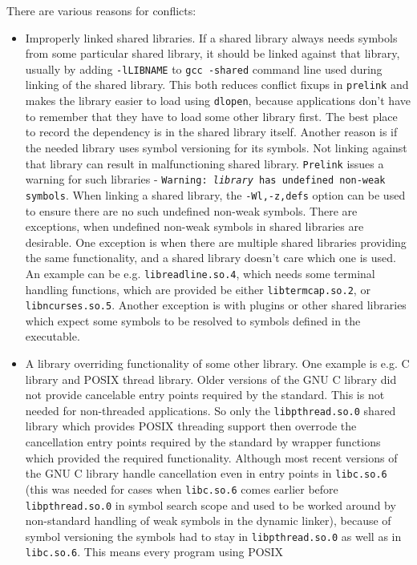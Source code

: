 \documentclass[twoside]{article}
\def\tts#1{\texttt{\small #1}}
\begin{document}
There are various reasons for conflicts:
\begin{itemize}
\item Improperly linked shared libraries.  If a shared library always needs
symbols from some particular shared library, it should be linked against
that library, usually by adding \tts{-lLIBNAME} to \tts{gcc -shared} command
line used during linking of the shared library.  This both reduces conflict
fixups in \tts{prelink} and makes the library easier to load using
\tts{dlopen}, because applications don't have to remember that they have
to load some other library first.  The best place to record the dependency
is in the shared library itself.  Another reason is if the needed library
uses symbol versioning for its symbols.  Not linking against that library
can result in malfunctioning shared library.  \tts{Prelink} issues a warning for
such libraries - \tts{Warning: {\sl library} has undefined non-weak symbols}.
When linking a shared library, the \tts{-Wl,-z,defs} option can be used to
ensure there are no such undefined non-weak symbols.  There are exceptions,
when undefined non-weak symbols in shared libraries are desirable.
One exception is when there are multiple shared libraries providing the
same functionality, and a shared library doesn't care which one is used.
An example can be e.g. \tts{libreadline.so.4}, which needs some terminal
handling functions, which are provided be either \tts{libtermcap.so.2},
or \tts{libncurses.so.5}.  Another exception is with plugins or other
shared libraries which expect some symbols to be resolved to symbols
defined in the executable.
\item A library overriding functionality of some other library.  One example
is e.g. C library and POSIX thread library.  Older versions of the GNU C library
did not provide cancelable entry points required by the standard.  This is
not needed for non-threaded applications.  So only the \tts{libpthread.so.0} shared
library which provides POSIX threading support then overrode the
cancellation entry points required by the standard by wrapper functions
which provided the required functionality.  Although most recent versions
of the GNU C library handle cancellation even in entry points in \tts{libc.so.6}
(this was needed for cases when \tts{libc.so.6} comes earlier before
\tts{libpthread.so.0} in symbol search scope and used to be worked around
by non-standard handling of weak symbols in the dynamic linker), because
of symbol versioning the symbols had to stay in \tts{libpthread.so.0}
as well as in \tts{libc.so.6}.  This means every program using POSIX

\end{itemize}
\end{document}
